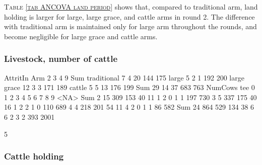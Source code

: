 \textsc{\normalsize Table \ref{tab ANCOVA land period}} shows that, compared to \textsf{traditional} arm, land holding is larger for \textsf{large}, \textsf{large grace}, and \textsf{cattle} arms in round 2. The difference with \textsf{traditional} arm is maintained only for \textsf{large} arm throughout the rounds, and become negligible for \textsf{large grace} and \textsf{cattle} arms. 



\subsubsection{Livestock, number of cattle}


\begin{Schunk}
\begin{Soutput}
             AttritIn
Arm             2   3   4   9 Sum
  traditional   7   4  20 144 175
  large         5   2   1 192 200
  large grace  12   3   3 171 189
  cattle        5   5  13 176 199
  Sum          29  14  37 683 763
     NumCows
tee      0    1    2    3    4    5    6    7    8    9 <NA>  Sum
  2     15  309  153   40   11    1    2    0    1    1  197  730
  3      5  337  175   40   16    1    2    2    1    0  110  689
  4      4  218  201   54   11    4    2    0    1    1   86  582
  Sum   24  864  529  134   38    6    6    2    3    2  393 2001
\end{Soutput}
\end{Schunk}



\begin{Schunk}
\begin{Soutput}
[1] 5
\end{Soutput}
\end{Schunk}




\subsubsection{Cattle holding}

